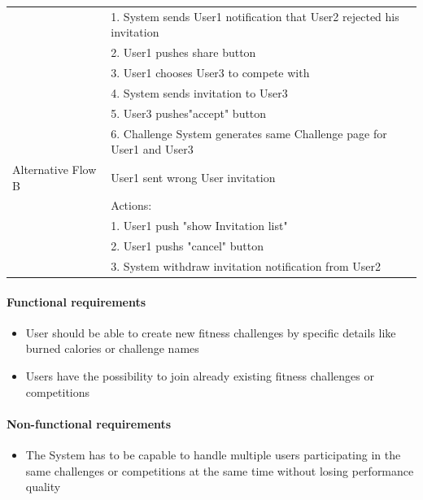\documentclass{article}
\begin{document}
\begin{table}[h!]
\begin{tabularx}{\textwidth}{|>{\raggedright\arraybackslash}p{}|X|}
                         & 1. System sends User1 notification that User2 rejected his invitation \\
                         & 2. User1 pushes share button \\
                         & 3. User1 chooses User3 to compete with\\
                         & 4. System sends invitation to User3 \\
                         & 5. User3 pushes"accept" button \\
                         & 6. Challenge System generates same Challenge page for User1 and User3 \\ \hline
        Alternative Flow B & User1 sent wrong User invitation \\
                         & Actions: \\
                         & 1. User1 push "show Invitation list" \\
                         & 2. User1 pushs "cancel" button \\
                         & 3. System withdraw invitation notification from User2\\ \hline
    \end{tabularx}
\end{table}

\paragraph{Functional requirements}
		\begin{itemize}
			\item  User should be able to create new fitness challenges by specific details like burned calories or
			challenge names
			\item  Users have the possibility to join already existing fitness challenges or competitions
		\end{itemize}
		
	\paragraph{Non-functional requirements}
		\begin{itemize}
			\item The System has to be capable to handle multiple users participating in the same challenges or
			competitions at the same time without losing performance quality
			
		\end{itemize}
\end{document}

